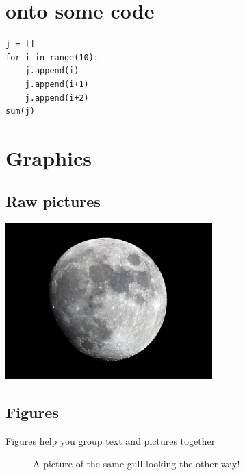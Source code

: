 \documentclass[10pt]{article}
\begin{document}
\section{onto some code}

\begin{verbatim}
j = []
for i in range(10):
    j.append(i)
    j.append(i+1)
    j.append(i+2)
sum(j)
\end{verbatim}

\section{Graphics}

\subsection{Raw pictures}

\includegraphics[height=60mm]{moon.jpg}

\subsection{Figures}

Figures help you group text and pictures together

\begin{figure}[!ht]
  \centering
  \caption{A picture of the same gull
           looking the other way!}
\end{figure}
\end{document}
